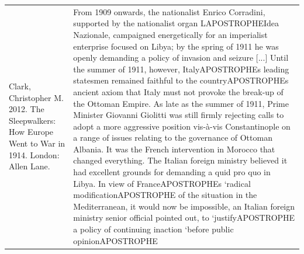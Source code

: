 {\begin{longtable}{p{}p{}}
\\
Clark, Christopher M. 2012. The Sleepwalkers: How Europe Went to War in 1914. London: Allen Lane.  & From 1909 onwards, the nationalist Enrico Corradini, supported by the nationalist organ LAPOSTROPHEIdea Nazionale, campaigned energetically for an imperialist enterprise focused on Libya; by the spring of 1911 he was openly demanding a policy of invasion and seizure [...] Until the summer of 1911, however, ItalyAPOSTROPHEs leading statesmen remained faithful to the countryAPOSTROPHEs ancient axiom that Italy must not provoke the break-up of the Ottoman Empire. As late as the summer of 1911, Prime Minister Giovanni Giolitti was still firmly rejecting calls to adopt a more aggressive position vis-à-vis Constantinople on a range of issues relating to the governance of Ottoman Albania. It was the French intervention in Morocco that changed everything. The Italian foreign ministry believed it had excellent grounds for demanding a quid pro quo in Libya. In view of FranceAPOSTROPHEs ‘radical modificationAPOSTROPHE of the situation in the Mediterranean, it would now be impossible, an Italian foreign ministry senior official pointed out, to ‘justifyAPOSTROPHE a policy of continuing inaction ‘before public opinionAPOSTROPHE
\\

\end{longtable}}

